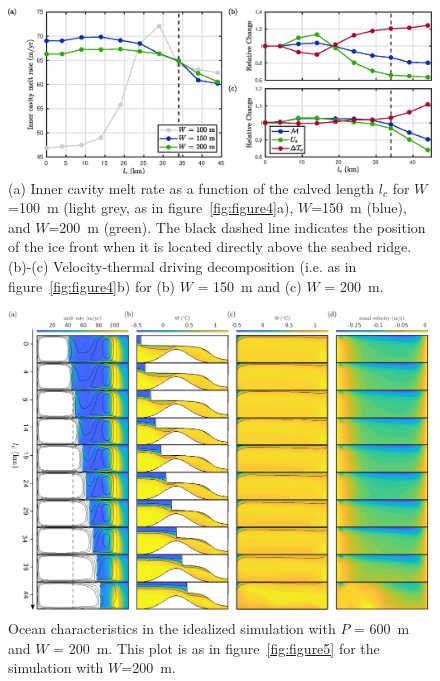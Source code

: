 \documentclass[draft]{agujournal2019}
\begin{document}


\begin{figure}
    \centering
    \includegraphics[width = \textwidth]{../make_figures/plots/figure6.eps}
    \caption{(a) Inner cavity melt rate as a function of the calved length $l_c$ for $W$=100~m (light grey, as in figure~\ref{fig:figure4}a), $W$=150~m (blue), and $W$=200~m (green). The black dashed line indicates the position of the ice front when it is located directly above the seabed ridge. (b)-(c) Velocity-thermal driving decomposition (i.e. as in figure~\ref{fig:figure4}b) for (b) $W$ = 150~m and (c) $W$ = 200~m.}
    \label{fig:figure6}
\end{figure}

\begin{figure}
    \centering
    \includegraphics[width = \textwidth]{../make_figures/plots/figure7_axislabel.pdf}
    \caption{Ocean characteristics in the idealized simulation with $P$ = 600~m and $W$ = 200~m. This plot is as in figure~\ref{fig:figure5} for the simulation with $W$=200~m.}
    \label{fig:figure7}
\end{figure}
\end{document}
